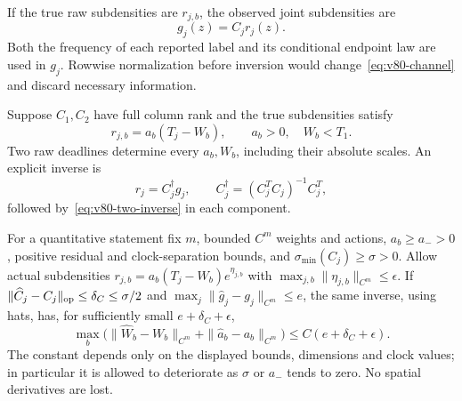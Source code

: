 If the true raw subdensities are $r_{j,b}$, the observed joint
subdensities are
\begin{equation}\label{eq:v80-channel}
                    g_j(z)=C_j r_j(z).
\end{equation}
Both the frequency of each reported label and its conditional endpoint
law are used in $g_j$.  Rowwise normalization before inversion would
change~\eqref{eq:v80-channel} and discard necessary information.

\begin{theorem}
\label{thm:v80-channel}
Suppose $C_1,C_2$ have full column rank and the true subdensities satisfy
\[
          r_{j,b}=a_b(T_j-W_b),\qquad a_b>0,\quad W_b<T_1.
\]
Two raw deadlines determine every $a_b,W_b$, including their absolute
scales.  An explicit inverse is
\begin{equation}\label{eq:v80-channel-inverse}
 r_j=C_j^\dagger g_j,\qquad
 C_j^\dagger=(C_j^TC_j)^{-1}C_j^T,
\end{equation}
followed by~\eqref{eq:v80-two-inverse} in each component.

For a quantitative statement fix $m$, bounded $C^m$ weights and actions,
$a_b\ge a_->0$, positive residual and clock-separation bounds, and
$\sigma_{\min}(C_j)\ge\sigma>0$.  Allow actual subdensities
$r_{j,b}=a_b(T_j-W_b)e^{\eta_{j,b}}$ with
$\max_{j,b}\|\eta_{j,b}\|_{C^m}\le\epsilon$.
If $\|\widehat C_j-C_j\|_{\rm op}\le\delta_C\le\sigma/2$ and
$\max_j\|\widehat g_j-g_j\|_{C^m}\le e$, the same inverse, using hats,
has, for sufficiently small $e+\delta_C+\epsilon$,
\begin{equation}\label{eq:v80-channel-stability}
 \max_b\bigl(\|\widehat W_b-W_b\|_{C^m}
             +\|\widehat a_b-a_b\|_{C^m}\bigr)
        \le C(e+\delta_C+\epsilon).
\end{equation}
The constant depends only on the displayed bounds, dimensions and
clock values; in particular it is allowed to deteriorate as
$\sigma$ or $a_-$ tends to zero.  No spatial derivatives are lost.
\end{theorem}
